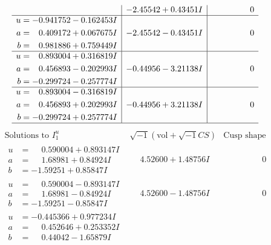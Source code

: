 \documentclass[1p]{elsarticle_modified}
\theoremstyle{definition}
\newcommand{\I}{\sqrt{-1}}
\begin{document}
$$\begin{array}{c|c|c}
 & -2.45542 + 0.43451 I & \phantom{-0.000000 } 0 \\ \hline\begin{aligned}
u &= -0.941752 - 0.162453 I \\
a &= \phantom{-}0.409172 + 0.067675 I \\
b &= \phantom{-}0.981886 + 0.759449 I\end{aligned}
 & -2.45542 - 0.43451 I & \phantom{-0.000000 } 0 \\ \hline\begin{aligned}
u &= \phantom{-}0.893004 + 0.316819 I \\
a &= \phantom{-}0.456893 - 0.202993 I \\
b &= -0.299724 - 0.257774 I\end{aligned}
 & -0.44956 - 3.21138 I & \phantom{-0.000000 } 0 \\ \hline\begin{aligned}
u &= \phantom{-}0.893004 - 0.316819 I \\
a &= \phantom{-}0.456893 + 0.202993 I \\
b &= -0.299724 + 0.257774 I\end{aligned}
 & -0.44956 + 3.21138 I & \phantom{-0.000000 } 0\\
 \hline 
 \end{array}$$\newpage$$\begin{array}{c|c|c}  
\text{Solutions to }I^u_{1}& \I (\text{vol} + \sqrt{-1}CS) & \text{Cusp shape}\\
 \hline 
\begin{aligned}
u &= \phantom{-}0.590004 + 0.893147 I \\
a &= \phantom{-}1.68981 + 0.84924 I \\
b &= -1.59251 + 0.85847 I\end{aligned}
 & \phantom{-}4.52600 + 1.48756 I & \phantom{-0.000000 } 0 \\ \hline\begin{aligned}
u &= \phantom{-}0.590004 - 0.893147 I \\
a &= \phantom{-}1.68981 - 0.84924 I \\
b &= -1.59251 - 0.85847 I\end{aligned}
 & \phantom{-}4.52600 - 1.48756 I & \phantom{-0.000000 } 0 \\ \hline\begin{aligned}
u &= -0.445366 + 0.977234 I \\
a &= \phantom{-}0.452646 + 0.253352 I \\
b &= \phantom{-}0.44042 - 1.65879 I\end{aligned}

\end{array}$$
\end{document}

